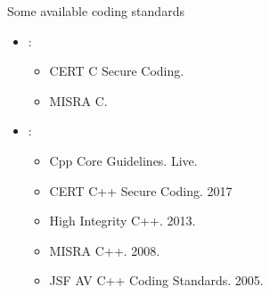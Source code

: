 \begin{frame}[t]{Some available coding standards}
\begin{itemize}
  \item {}:
    \begin{itemize}
      \item CERT C Secure Coding.
      \item MISRA C.
    \end{itemize}

  \item {}:
    \begin{itemize}
      \item Cpp Core Guidelines. Live.
      \item CERT C++ Secure Coding. 2017
      \item High Integrity C++. 2013.
      \item MISRA C++. 2008.
      \item JSF AV C++ Coding Standards. 2005.
    \end{itemize}
\end{itemize}
\end{frame}

